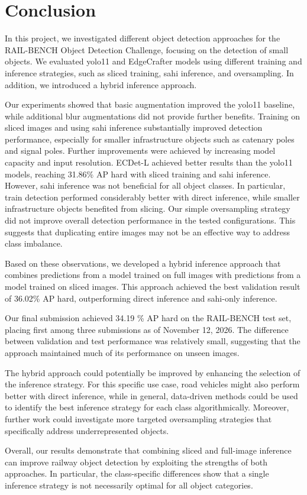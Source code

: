 \chapter{Conclusion}
\label{ch:conclusion}
In this project, we investigated different object detection approaches for the RAIL-BENCH Object Detection Challenge, focusing on the detection of small objects.
We evaluated \acrshort{yolo}11 and EdgeCrafter models using different training and inference strategies, such as sliced training, \acrshort{sahi} inference, and oversampling. In addition, we introduced a hybrid inference approach.

Our experiments showed that basic augmentation improved the \acrshort{yolo}11 baseline, while additional blur augmentations did not provide further benefits. Training on sliced images and using \acrshort{sahi} inference substantially improved detection performance, especially for smaller infrastructure objects such as catenary poles and signal poles.
Further improvements were achieved by increasing model capacity and input resolution.
ECDet-L achieved better results than the \acrshort{yolo}11 models, reaching 31.86\% AP hard with sliced training and \acrshort{sahi} inference.
However, \acrshort{sahi} inference was not beneficial for all object classes. In particular, train detection performed considerably better with direct inference, while smaller infrastructure objects benefited from slicing.
Our simple oversampling strategy did not improve overall detection performance in the tested configurations. This suggests that duplicating entire images may not be an effective way to address class imbalance.

Based on these observations, we developed a hybrid inference approach that combines predictions from a model trained on full images with predictions from a model trained on sliced images. This approach achieved the best validation result of 36.02\% AP hard, outperforming direct inference and \acrshort{sahi}-only inference.

Our final submission achieved 34.19 \% AP hard on the RAIL-BENCH test set, placing first among three submissions as of November 12, 2026. The difference between validation and test performance was relatively small, suggesting that the approach maintained much of its performance on unseen images.

The hybrid approach could potentially be improved by enhancing the selection of the inference strategy. For this specific use case, road vehicles might also perform better with direct inference, while in general, data-driven methods could be used to identify the best inference strategy for each class algorithmically.
Moreover, further work could investigate more targeted oversampling strategies that specifically address underrepresented objects.

Overall, our results demonstrate that combining sliced and full-image inference can improve railway object detection by exploiting the strengths of both approaches. In particular, the class-specific differences show that a single inference strategy is not necessarily optimal for all object categories.
